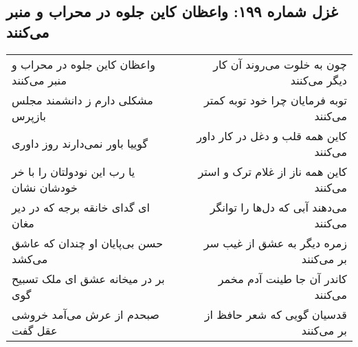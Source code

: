 \begin{center}
\section*{غزل شماره ۱۹۹: واعظان کاین جلوه در محراب و منبر می‌کنند}
\label{sec:sh199}
\begin{longtable}{l p{0.5cm} r}
واعظان کاین جلوه در محراب و منبر می‌کنند
&&
چون به خلوت می‌روند آن کار دیگر می‌کنند
\\
مشکلی دارم ز دانشمند مجلس بازپرس
&&
توبه فرمایان چرا خود توبه کمتر می‌کنند
\\
گوییا باور نمی‌دارند روز داوری
&&
کاین همه قلب و دغل در کار داور می‌کنند
\\
یا رب این نودولتان را با خر خودشان نشان
&&
کاین همه ناز از غلام ترک و استر می‌کنند
\\
ای گدای خانقه برجه که در دیر مغان
&&
می‌دهند آبی که دل‌ها را توانگر می‌کنند
\\
حسن بی‌پایان او چندان که عاشق می‌کشد
&&
زمره دیگر به عشق از غیب سر بر می‌کنند
\\
بر در میخانه عشق ای ملک تسبیح گوی
&&
کاندر آن جا طینت آدم مخمر می‌کنند
\\
صبحدم از عرش می‌آمد خروشی عقل گفت
&&
قدسیان گویی که شعر حافظ از بر می‌کنند
\\
\end{longtable}
\end{center}
